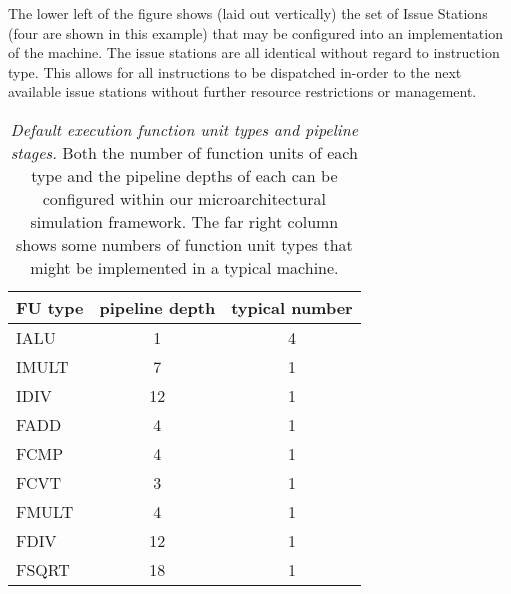 \documentclass[10pt,dvips]{article}
\begin{document}
The lower left of the figure shows (laid out vertically) the set of
Issue Stations (four are shown in this example)
that may be configured into an implementation of
the machine.
The issue stations are all identical without regard to 
instruction type.  This allows for all instructions to be
dispatched in-order to the next available issue stations 
without further resource restrictions or management.
%
%
\begin{table}[p]
\begin{center}
\caption{{\em Default execution function unit types and pipeline stages.}
Both the number of function units of each type and the pipeline depths 
of each
can be configured within our microarchitectural simulation framework.
The far right column shows some numbers of function unit
types that might be implemented in a typical machine.}
\label{tab:futypes}
\vspace{+0.1in}
\scriptsize{
\begin{tabular}{|l|c|c|}
\hline 
FU type&pipeline depth&typical number\\
\hline
IALU&1&4\\
\hline
IMULT&7&1\\
\hline
IDIV&12&1\\
\hline
FADD&4&1\\
\hline
FCMP&4&1\\
\hline
FCVT&3&1\\
\hline
FMULT&4&1\\
\hline
FDIV&12&1\\
\hline
FSQRT&18&1\\
\hline
\end{tabular}
}
\end{center}
\end{table}
%
%
\end{document}
